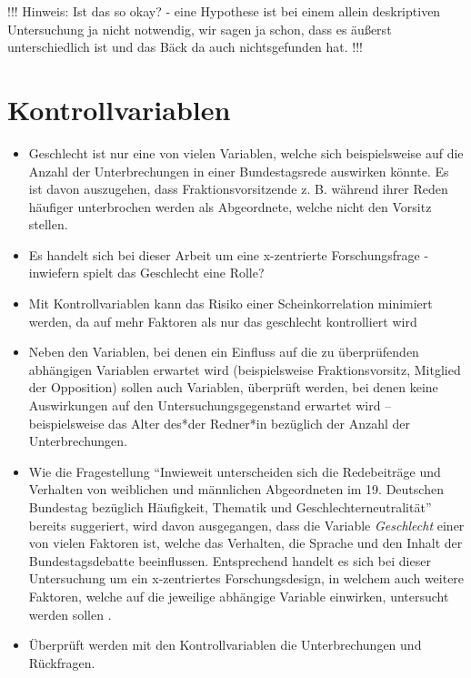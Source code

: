 \documentclass[12pt, 
    twoside=false, 
    bibliography=totoc, 
    numbers=endperiod, 
    headings=normal, 
    toc=chapterentrydotfill
    ]{scrbook}
\begin{document}
!!! Hinweis: Ist das so okay? - eine Hypothese ist bei einem allein deskriptiven Untersuchung ja nicht notwendig, wir sagen ja schon, dass es äußerst unterschiedlich ist und das Bäck da auch nichtsgefunden hat. !!!

\section{Kontrollvariablen}

\begin{itemize}
    \item Geschlecht ist nur eine von vielen Variablen, welche sich beispielsweise auf die Anzahl der Unterbrechungen in einer Bundestagsrede auswirken könnte. Es ist davon auszugehen, dass Fraktionsvorsitzende z. B. während ihrer Reden häufiger unterbrochen werden als Abgeordnete, welche nicht den Vorsitz stellen.
    \item Es handelt sich bei dieser Arbeit um eine x-zentrierte Forschungsfrage \parencite[vgl.][4f.]{ganghof_2005}- inwiefern spielt das Geschlecht eine Rolle?
    \item Mit Kontrollvariablen kann das Risiko einer Scheinkorrelation minimiert werden, da auf mehr Faktoren als nur das geschlecht kontrolliert wird
    \item Neben den Variablen, bei denen ein Einfluss auf die zu überprüfenden abhängigen Variablen erwartet wird (beispielsweise Fraktionsvorsitz, Mitglied der Opposition) sollen auch Variablen, überprüft werden, bei denen keine Auswirkungen auf den Untersuchungsgegenstand erwartet wird -- beispielsweise das Alter des*der Redner*in bezüglich der Anzahl der Unterbrechungen.
    \item Wie die Fragestellung \enquote{Inwieweit unterscheiden sich die Redebeiträge und Verhalten von weiblichen und männlichen Abgeordneten im 19. Deutschen Bundestag bezüglich Häufigkeit, Thematik und Geschlechterneutralität} bereits suggeriert, wird davon ausgegangen, dass die Variable \emph{Geschlecht} einer von vielen Faktoren ist, welche das Verhalten, die Sprache und den Inhalt der Bundestagsdebatte beeinflussen. Entsprechend handelt es sich bei dieser Untersuchung um ein x-zentriertes Forschungsdesign, in welchem auch weitere Faktoren, welche auf die jeweilige abhängige Variable einwirken, untersucht werden sollen  \parencites[vgl.][3f.]{ganghof_2005}.
    \item Überprüft werden mit den Kontrollvariablen die Unterbrechungen und Rückfragen. 
\end{itemize}
\end{document}
